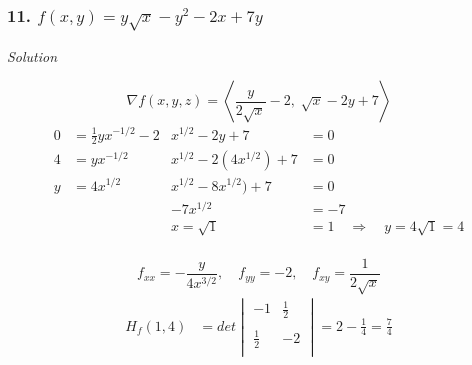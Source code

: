 \documentclass{article}
\newcommand\vv[1]{\left\langle #1 \right\rangle}
\newcommand\rr{\quad\Rightarrow\quad}
\newcommand{\solution}{\centerline{\textit{Solution}}}
\begin{document}
{\subsubsection*{11. $f(x,y)=y\sqrt x -y^2-2x+7y$}
\solution
\vspace{1em}
\[
    \nabla f(x,y,z) = \vv{\frac {y}{2\sqrt x} - 2,\;\sqrt x -2y+7} 
\]
\begin{align*}
    0 &= \frac 1 2 yx^{-1/2} -2 & x^{1/2} - 2y + 7 &= 0 \\
    4 &= yx^{-1/2} & x^{1/2} -2(4x^{1/2}) + 7 &= 0 \\
    y &= 4x^{1/2} & x^{1/2} -8x^{1/2}) + 7 &= 0 \\
      & & -7x^{1/2} &= -7 \\
      & & x = \sqrt 1 &= 1 \rr y = 4\sqrt 1 = 4
\end{align*}
 \\
\[
    f_{xx} = -\displaystyle\frac{y}{4x^{3/2}},\quad f_{yy} = -2,\quad
    f_{xy} = \displaystyle\frac{1}{2\sqrt x}
\]
\begin{align*}
    H_{f}(1,4) &= det\begin{vmatrix} 
    -1 & \frac 1 2 \\\\
    \frac 1 2 & -2 \\
    \end{vmatrix} = 2 - \frac 1 4 = \frac 7 4
\end{align*}
\\\\
\newpage
}
\end{document}
